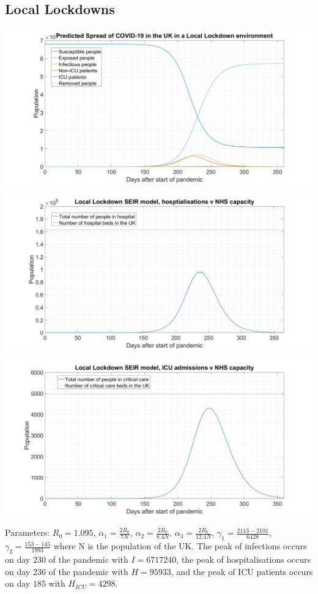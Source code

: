 \documentclass[11pt]{article}
\begin{document}
\subsection{Local Lockdowns}
\begin{center}
\includegraphics[width=1\textwidth]{LLSEIHR.jpg} 

\includegraphics[width=1\textwidth]{LLH.jpg} 

\includegraphics[width=1\textwidth]{LLHICU.jpg} 
\end{center}
Parameters: $R_0=1.095$, $\alpha_1=\frac{2R_0}{7N}$, $\alpha_2=\frac{2R_0}{8.4N}$, $\alpha_3=\frac{2R_0}{12.4N}$, $\gamma_1=\frac{2113-2101}{6428}$, $\gamma_2=\frac{153-145}{1993}$ where N is the population of the UK. The peak of infections occurs on day $230$ of the pandemic with $I=6717240$, the peak of hospitalisations occurs on day $236$ of the pandemic with $H=95933$, and the peak of ICU patients occurs on day $185$ with $H_{ICU}=4298$. \par 
\end{document}
